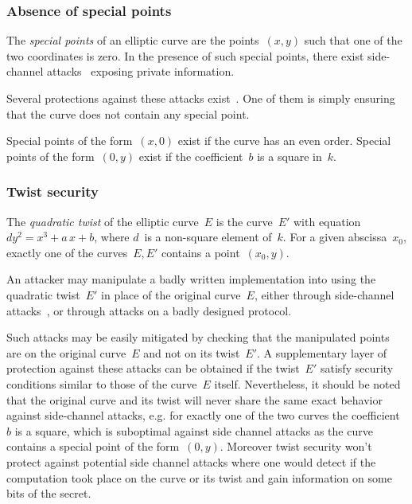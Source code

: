 \documentclass[twocolumn,letterpaper,10pt]{article}
\begin{document}
\subsubsection{Absence of special points}
\label{sss:special-points}

The \emph{special points} of an elliptic curve
are the points~$(x,y)$ such that one of the two coordinates is zero.
In the presence of such special points,
there exist side-channel attacks~\cite{pkc2003goubin}
exposing private information.

Several protections against these attacks exist~\cite{ches2004mmm}.
One of them is simply ensuring that the curve does not contain
any special point.

Special points of the form~$(x, 0)$ exist if the curve has
an even order.
Special points of the form~$(0, y)$ exist if the coefficient~$b$
is a square in~$k$.

\subsubsection{Twist security}
\label{sss:twist}

The \emph{quadratic twist} of the elliptic curve~$E$
is the curve~$E'$ with equation~$d y^2 = x^3 + a\,x + b$,
where $d$~is a non-square element of~$k$.
For a given abscissa~$x_0$,
exactly one of the curves~$E, E'$ contains a point~$(x_0, y)$.

An attacker may manipulate a badly written implementation
into using the quadratic twist~$E'$
in place of the original curve~$E$,
either through side-channel attacks~\cite{fdtc2008flrv},
or through attacks on a badly designed protocol.

Such attacks may be easily mitigated by checking
that the manipulated points are on the original curve~$E$
and not on its twist~$E'$.
A supplementary layer of protection against these attacks
can be obtained if the twist~$E'$ satisfy
security conditions similar to those of the curve~$E$ itself.
Nevertheless, it should be noted that the original curve and
its twist will never share the same exact behavior against
side-channel attacks, e.g. for exactly one of the two curves the coefficient $b$
is a square, which is suboptimal against side channel attacks
as the curve contains a special point of the form~$(0, y)$.
Moreover twist security won't protect against potential side channel attacks
where one would detect if the computation took place on the curve or its twist
and gain information on some bits of the secret.
\end{document}
